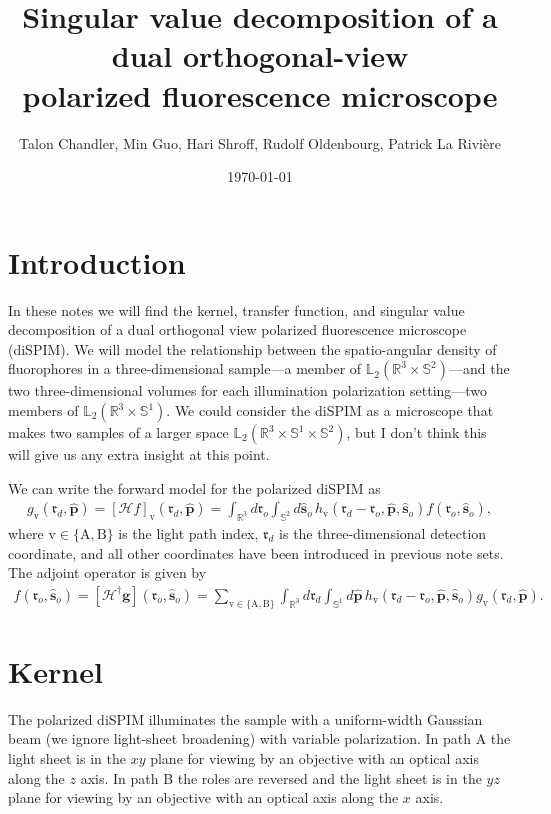 \documentclass[11pt]{article}
\providecommand{\mb}[1]{\mathbf{#1}}
\providecommand{\mc}[1]{\mathcal{#1}}
\providecommand{\ro}{\mathbf{\mathfrak{r}}_o}
\providecommand{\so}{\mathbf{\hat{s}}_o}
\providecommand{\rd}{\mathbf{\mathfrak{r}}_d}
\providecommand{\mh}[1]{\mathbf{\hat{#1}}}
\providecommand{\mbb}[1]{\mathbb{#1}}
\providecommand{\tv}{\text{v}}
\providecommand{\p}{\mh{p}}
\providecommand{\intr}[1]{\int_{\mbb{R}^{#1}}}
\providecommand{\ints}[1]{\int_{\mbb{S}^{#1}}}
\begin{document}
\title{\vspace{-2.5em} Singular value decomposition of a dual orthogonal-view\\
  polarized fluorescence microscope\vspace{-1em}} \author{Talon Chandler, Min
  Guo, Hari Shroff, Rudolf Oldenbourg, Patrick La Rivi\`ere}
\date{\vspace{-1em}\today\vspace{-1em}}
\maketitle
\section{Introduction}
In these notes we will find the kernel, transfer function, and singular value
decomposition of a dual orthogonal view polarized fluorescence microscope
(diSPIM). We will model the relationship between the spatio-angular density of
fluorophores in a three-dimensional sample---a member of
$\mbb{L}_2(\mbb{R}^3 \times \mbb{S}^2)$---and the two three-dimensional volumes
for each illumination polarization setting---two members of
$\mbb{L}_2(\mbb{R}^3 \times \mbb{S}^1)$. We could consider the diSPIM as a
microscope that makes two samples of a larger space
$\mbb{L}_2(\mbb{R}^3 \times \mbb{S}^1 \times \mbb{S}^2)$, but I don't think this
will give us any extra insight at this point.

We can write the forward model for the polarized diSPIM as
\begin{align}
  g_{\tv}(\rd, \p) = \left[\mc{H}f\right]_\tv(\rd, \p) = \intr{3}d\ro \ints{2}d\so\, h_{\tv}(\rd - \ro, \p, \so)f(\ro, \so), \label{eq:fwd}
\end{align}
where $\tv \in \{\text{A}, \text{B}\}$ is the light path index, $\rd$ is the
three-dimensional detection coordinate, and all other coordinates have been
introduced in previous note sets. The adjoint operator is given by
\begin{align}
  f(\ro, \so) = [\mc{H}^\dagger \mb{g}](\ro, \so) = \sum_{\tv \in \{\text{A}, \text{B}\}} \intr{3}d\rd\ints{1}d\p\, h_{\tv}(\rd - \ro, \p, \so)g_{\tv}(\rd, \p). \label{eq:adj}
\end{align}
\section{Kernel}
The polarized diSPIM illuminates the sample with a uniform-width Gaussian beam
(we ignore light-sheet broadening) with variable polarization. In path A the
light sheet is in the $xy$ plane for viewing by an objective with an optical
axis along the $z$ axis. In path B the roles are reversed and the light sheet is
in the $yz$ plane for viewing by an objective with an optical axis along the $x$
axis.
\end{document}
